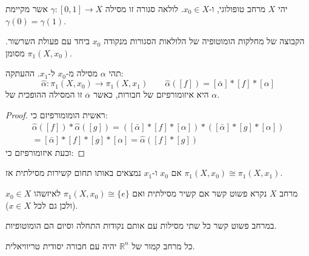 \documentclass{tstextbook}
\begin{document}
\begin{definition}
יהי \(X\) מרחב טופולוגי, ו-\(x_{0} \in X\). לולאה סגורה זו מסילה \(\gamma:[0,1]\to X\) אשר מקיימת \(\gamma(0)=\gamma(1)\).

\end{definition}
\begin{definition}
הקבוצה של מחלקות הומוטופיה של הלולאות הסגורות מנקודה \(x_{0}\) ביחד עם פעולת השרשור. מסומן \(\pi_{1}(X,x_{0})\).

\end{definition}
\begin{proposition}
תהי \(\alpha\) מסילה מ-\(x_{0}\) ל-\(x_{1}\). ההעתקה:
$$\hat{\alpha}:\pi_{1}(X,x_{0})\longrightarrow\pi_{1}(X,x_{1})\qquad \hat{\alpha}([f])=[\bar{\alpha}]*[f]*[\alpha]$$
היא איזומורפיזם של חבורות, כאשר \(\overline{\alpha}\) זו המסילה ההופכית של \(\alpha\).

\end{proposition}
\begin{proof}
ראשית הומומורפיזם כי:
\begin{gather*}\hat{\alpha}([f])*\hat{\alpha}([g])=\left( \left[ \bar{\alpha} \right]*[f]*\left[ \alpha \right] \right)*\left( \left[ \bar{\alpha} \right]*[g]*\left[ \alpha \right] \right)  \\=[\bar{\alpha}]\ast[f]\ast[g]\ast[\alpha]={\hat{\alpha}}([f]\ast[g])
\end{gather*}
וכעת איזומורפיזם כי:

\end{proof}
\begin{corollary}
אם \(x_{0}\) ו-\(x_{1}\) נמצאים באותו תחום קשירות מסילתית אז  \(\pi_{1}(X,x_{0})\cong \pi_{1}(X,x_{1})\).

\end{corollary}
\begin{definition}
מרחב \(X\) נקרא פשוט קשר אם קשיר מסילתית ואם \(\pi_{1}(X,x_{0})\cong\{ e \}\) לאיזשהו \(x_{0} \in X\)(ולכן גם לכל \(x \in X\)).

\end{definition}
\begin{proposition}
במרחב פשוט קשר כל שתי מסילות עם אותם נקודות התחלה וסיום הם הומוטופיות.

\end{proposition}
\begin{example}
כל מרחב קמור של \(\mathbb{R}^{n}\) יהיה עם חבורה יסודית טריוויאלית.

\end{example}
\end{document}
